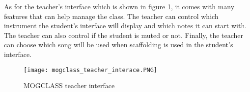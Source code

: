 As for the teacher’s interface which is shown in figure \ref{fig:mogclass_teacher_interface}, it comes with many features that can help manage the class. The teacher can control which instrument the student’s interface will display and which notes it can start with. The teacher can also control if the student is muted or not. Finally, the teacher can choose which song will be used when scaffolding is used in the student’s interface.

\begin{figure}[H]
    \centering
    \texttt{[image: mogclass\_teacher\_interace.PNG]}
    \caption{MOGCLASS teacher interface \protect\cite{zhou2011mogclass}}
    \label{fig:mogclass_teacher_interface}
\end{figure}




